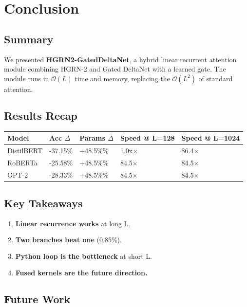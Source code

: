\section{Conclusion}

\subsection{Summary}

We presented \textbf{HGRN2-GatedDeltaNet}, a hybrid linear recurrent attention 
module combining HGRN-2 and Gated DeltaNet with a learned gate. The module 
runs in $\mathcal{O}(L)$ time and memory, replacing the $\mathcal{O}(L^2)$ 
of standard attention.

\subsection{Results Recap}

\begin{table}[H]
\centering
\small
\begin{tabular}{lllll}
\toprule
\textbf{Model} & \textbf{Acc $\Delta$} & \textbf{Params $\Delta$} & \textbf{Speed @ L=128} & \textbf{Speed @ L=1024} \\
\midrule
DistilBERT & -37.15\% & +48.5\%\% & 1.0x$\times$ & 86.4$\times$ \\
RoBERTa & -25.58\% & +48.5\%\% & 84.5$\times$ & 84.5$\times$ \\
GPT-2 & -28.33\% & +48.5\%\% & 84.5$\times$ & 84.5$\times$ \\
\bottomrule
\end{tabular}
\end{table}

\subsection{Key Takeaways}

\begin{enumerate}
\item \textbf{Linear recurrence works} at long L.
\item \textbf{Two branches beat one} (0.85\%).
\item \textbf{Python loop is the bottleneck} at short L.
\item \textbf{Fused kernels are the future direction.}

\end{enumerate}
\subsection{Future Work}

